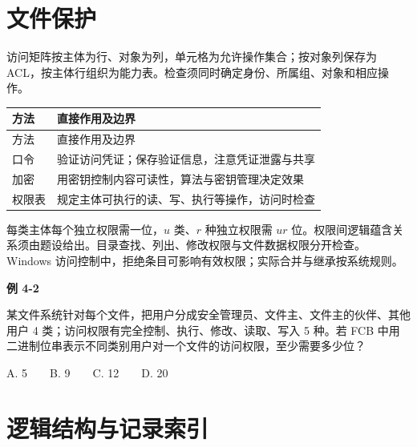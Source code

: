 \section{文件保护}\label{OS04-protection}

访问矩阵按主体为行、对象为列，单元格为允许操作集合；按对象列保存为 ACL，按主体行组织为能力表。检查须同时确定身份、所属组、对象和相应操作。

\par\smallskip
{\fontsize{9.3}{12}\selectfont\setlength{\tabcolsep}{2.5pt}\setlength{\LTleft}{0pt}\setlength{\LTright}{0pt}
\begin{longtable}{@{}>{\raggedright\arraybackslash}p{}>{\raggedright\arraybackslash}p{}@{}}
\toprule
方法 & 直接作用及边界 \\

\midrule\endfirsthead\toprule
方法 & 直接作用及边界 \\

\midrule\endhead\bottomrule\endfoot
口令 & 验证访问凭证；保存验证信息，注意凭证泄露与共享 \\

加密 & 用密钥控制内容可读性，算法与密钥管理决定效果 \\

权限表 & 规定主体可执行的读、写、执行等操作，访问时检查 \\

\end{longtable}}
\par\smallskip

每类主体每个独立权限需一位，\(u\) 类、\(r\) 种独立权限需 \(ur\) 位。权限间逻辑蕴含关系须由题设给出。目录查找、列出、修改权限与文件数据权限分开检查。Windows 访问控制中，拒绝条目可影响有效权限；实际合并与继承按系统规则。

\par\medskip{}\noindent\hypertarget{OS04-E02}{}\label{OS04-E02}\textbf{例 4-2}\par\nobreak\smallskip

某文件系统针对每个文件，把用户分成安全管理员、文件主、文件主的伙伴、其他用户 4 类；访问权限有完全控制、执行、修改、读取、写入 5 种。若 FCB 中用二进制位串表示不同类别用户对一个文件的访问权限，至少需要多少位？

A. 5　　B. 9　　C. 12　　D. 20

\section{逻辑结构与记录索引}\label{OS04-records}

